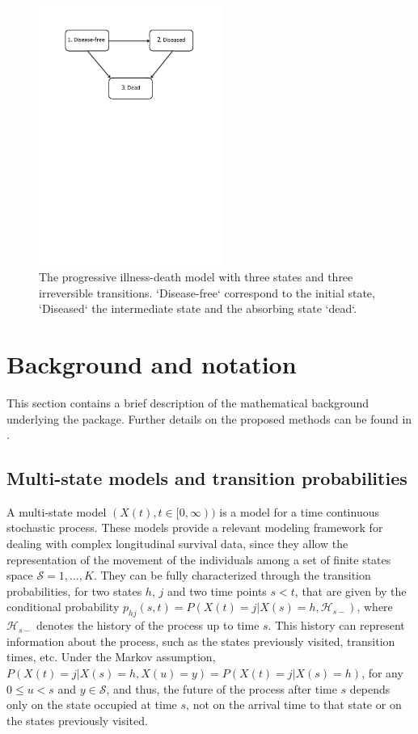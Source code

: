 \begin{figure} [t] %
\centering
\includegraphics[width=6cm]{illness-death.pdf}
\caption{\label{IDM} The progressive illness-death model with three states and three irreversible transitions. `Disease-free` correspond to the initial state, `Diseased` the intermediate state and the absorbing state `dead`.}
\end{figure}


\section{Background and notation} \label{sec:methodology}

This section contains a brief description of the mathematical background underlying the  package. Further details on the proposed methods can be found in \cite{soutinho_machado2020}.

\subsection{Multi-state models and transition probabilities} \label{multi}
A multi-state model $(X(t),t\in [0,\infty))$ is a model for a time continuous stochastic process. These models provide a relevant modeling framework for dealing with complex longitudinal survival data, since they allow the representation of the movement of the individuals among a set of finite states space $\mathcal{S}={1,\ldots ,K}$. They can be fully characterized through the transition probabilities, for two states $h$, $j$ and two time points $s < t$, that are given by the conditional probability $p_{hj}(s,t)=P(X(t)=j|X(s)=h, \mathcal{H}_{s-})$, where $\mathcal{H}_{s-}$ denotes the history of the process up to time $s$. This history can represent information about the process, such as the states previously visited, transition times, etc. Under the Markov assumption, $P(X(t)=j|X(s)=h, X(u)=y)=P(X(t)=j|X(s)=h)$, for any $0\leq u<s$ and $y \in \mathcal{S}$, and thus, the future of the process after time $s$ depends only on the state occupied at time $s$, not on the arrival time to that state or on the states previously visited.  

